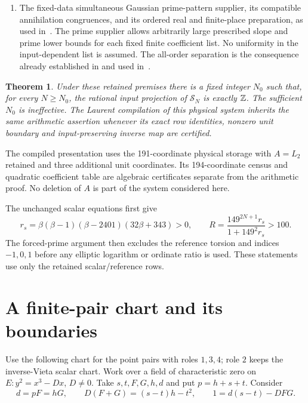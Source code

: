 \documentclass[11pt,a4paper]{article}
\newtheorem{theorem}[proposition]{Theorem}
\begin{document}
\begin{enumerate}
$2,3,17$ have been established. Its analytic and arithmetic foundations
are included in this retained interface.
\item The fixed-data simultaneous Gaussian prime-pattern supplier,
its compatible annihilation congruences, and its ordered real and
finite-place preparation, as used in~\cite{InverseVieta,Uniform}.
The prime supplier allows arbitrarily large prescribed slope and
prime lower bounds for each fixed finite coefficient list. No
uniformity in the input-dependent list is assumed.
The all-order separation is the consequence already established in
\cite[Theorem 2.2]{PrimeSeparation} and used in~\cite[P16]{Uniform}.
\end{enumerate}

\begin{theorem}\label{thm:arithmetic}
Under these retained premises there is a fixed integer $N_0$ such
that, for every $N\ge N_0$, the rational input projection of
$\mathcal S_N$ is exactly $\mathbb Z$. The sufficient $N_0$ is ineffective.
The Laurent compilation of this physical system inherits the same
arithmetic assertion whenever its exact row identities, nonzero unit
boundary and input-preserving inverse map are certified.
\end{theorem}

The compiled presentation uses the 191-coordinate physical storage
with $A=L_2$ retained and three additional unit coordinates. Its
194-coordinate census and quadratic coefficient table are algebraic
certificates separate from the arithmetic proof. No deletion of $A$
is part of the system considered here.

The unchanged scalar equations first give
\[
 r_s=\beta(\beta-1)(\beta-2401)(32\beta+343)>0,\qquad
 R=\frac{149^{2N+1}r_s}{1+149^2r_s}>100.
\]
The forced-prime argument then excludes the reference torsion and
indices $-1,0,1$ before any elliptic logarithm or ordinate ratio is
used. These statements use only the retained scalar/reference rows.

\section{A finite-pair chart and its boundaries}

Use the following chart for the point pairs with roles $1,3,4$;
role $2$ keeps the inverse-Vieta scalar chart.
Work over a field of characteristic zero on $E:y^2=x^3-Dx$, $D\ne0$.
Take $s,t,F,G,h,d$ and put $p=h+s+t$. Consider
\begin{equation}\label{eq:chart}
 d=pF=hG,\qquad D(F+G)=(s-t)h-t^2,\qquad
                       1=d(s-t)-DFG.
\end{equation}
\end{document}
